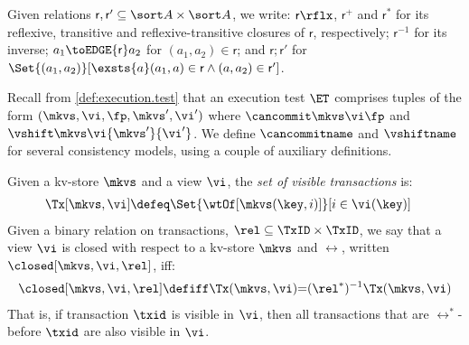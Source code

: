 Given relations $\mathsf r, \mathsf r' \subseteq \sort A \times \sort A$,
we write:  $\mathsf r\rflx$, $\mathsf r^+$ and $\mathsf r^*$ for its reflexive, transitive and reflexive-transitive closures of $\mathsf r$, respectively;
$\mathsf r^{-1}$ for its inverse;
$a_1 \toEDGE{\mathsf r} a_2$ for $(a_1, a_2) \in \mathsf r$;
and \( \mathsf r; \mathsf r'\) for \( \Set{(a_1,a_2)}[\exsts{a} (a_1,a) \in \mathsf r\land (a,a_2) \in \mathsf r']\).

Recall from \cref{def:execution.test} that an execution test $\ET$
comprises  tuples of the form $(\mkvs,\vi, \fp, \mkvs', \vi')$ 
where  $\cancommit \mkvs \vi \fp$ and $\vshift \mkvs \vi {\mkvs'} {\vi'}$. 
We define $\cancommitname$ and $\vshiftname$ for several consistency
models, using a couple of auxiliary definitions. 


Given a kv-store $\mkvs$ and a view $\vi$, the {\em set of visible
transactions} is: 
{%
\displaymathfont
\begin{align*}
\Tx[\mkvs, \vi] & \defeq
\Set{\wtOf[\mkvs(\key, i)] }[ i \in \vi(\key)]
\end{align*}
}%
%
%
%
%
%
Given a binary relation on transactions, $\rel \subseteq \TxID \times \TxID$, we say that a view $\vi$ is closed with respect to a kv-store $\mkvs$ and $\rel$, written $\closed[\mkvs,\vi,\rel]$, iff:  
{%
\displaymathfont
\begin{align*}
	\closed[\mkvs,\vi,\rel]
	\defiff
	\Tx(\mkvs, \vi) {=} 
	(\rel^*)^{-1} \Tx(\mkvs, \vi)
\end{align*}
}%
That is, if transaction $\txid$ is visible in $\vi$, then all transactions that are $\rel^*$-before $\txid$ are also visible in $\vi$.


